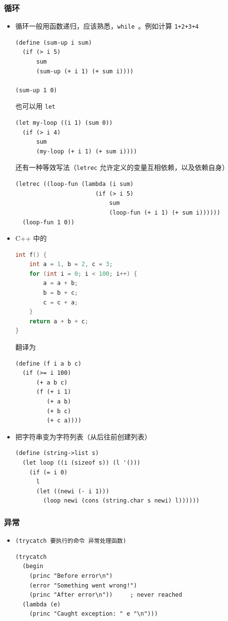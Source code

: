 \subsubsection{循环}
\begin{itemize}
\item 循环一般用函数递归，应该熟悉，\verb`while `。例如计算 \verb`1+2+3+4`
\begin{lstlisting}[language=none]
(define (sum-up i sum)
  (if (> i 5)
      sum
      (sum-up (+ i 1) (+ sum i))))

(sum-up 1 0)
\end{lstlisting}
也可以用 \verb`let`
\begin{lstlisting}[language=none]
(let my-loop ((i 1) (sum 0))
  (if (> i 4)
      sum
      (my-loop (+ i 1) (+ sum i))))
\end{lstlisting}
还有一种等效写法（\verb`letrec` 允许定义的变量互相依赖，以及依赖自身）
\begin{lstlisting}[language=none]
(letrec ((loop-fun (lambda (i sum)
                       (if (> i 5)
                           sum
                           (loop-fun (+ i 1) (+ sum i))))))
  (loop-fun 1 0))
\end{lstlisting}

\item C++ 中的
\begin{lstlisting}[language=cpp]
int f() {
    int a = 1, b = 2, c = 3;
    for (int i = 0; i < 100; i++) {
        a = a + b;
        b = b + c;
        c = c + a;
    }
    return a + b + c;
}
\end{lstlisting}
翻译为
\begin{lstlisting}[language=none]
(define (f i a b c)
  (if (>= i 100)
      (+ a b c)
      (f (+ i 1)
         (+ a b)
         (+ b c)
         (+ c a))))
\end{lstlisting}

\item 把字符串变为字符列表（从后往前创建列表）
\begin{lstlisting}[language=none]
(define (string->list s)
  (let loop ((i (sizeof s)) (l '()))
    (if (= i 0)
	  l
	  (let ((newi (- i 1)))
	    (loop newi (cons (string.char s newi) l))))))
\end{lstlisting}
\end{itemize}


\subsubsection{异常}
\begin{itemize}
\item \verb`(trycatch 要执行的命令 异常处理函数)`
\begin{lstlisting}[language=none]
(trycatch
  (begin
    (princ "Before error\n")
    (error "Something went wrong!")
    (princ "After error\n"))     ; never reached
  (lambda (e)
    (princ "Caught exception: " e "\n")))
\end{lstlisting}
\end{itemize}


